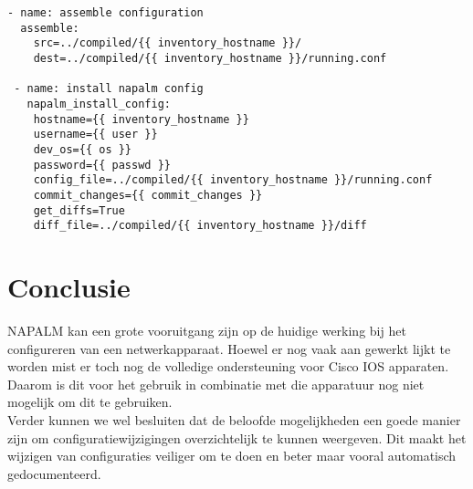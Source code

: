 \begin{center}
\begin{BVerbatim}
- name: assemble configuration
  assemble:
    src=../compiled/{{ inventory_hostname }}/
    dest=../compiled/{{ inventory_hostname }}/running.conf

 - name: install napalm config
   napalm_install_config:
    hostname={{ inventory_hostname }}
    username={{ user }}
    dev_os={{ os }}
    password={{ passwd }}
    config_file=../compiled/{{ inventory_hostname }}/running.conf
    commit_changes={{ commit_changes }}
    get_diffs=True
    diff_file=../compiled/{{ inventory_hostname }}/diff
\end{BVerbatim}
\end{center}


\section{Conclusie}
\label{ch:napalconclusie}
NAPALM kan een grote vooruitgang zijn op de huidige werking bij het configureren van een netwerkapparaat. Hoewel er nog vaak aan gewerkt lijkt te worden mist er toch nog de volledige ondersteuning voor Cisco IOS apparaten. Daarom is dit voor het gebruik in combinatie met die apparatuur nog niet mogelijk om dit te gebruiken.
\\

Verder kunnen we wel besluiten dat de beloofde mogelijkheden een goede manier zijn om configuratiewijzigingen overzichtelijk te kunnen weergeven. Dit maakt het wijzigen van configuraties veiliger om te doen en beter maar vooral automatisch gedocumenteerd.
